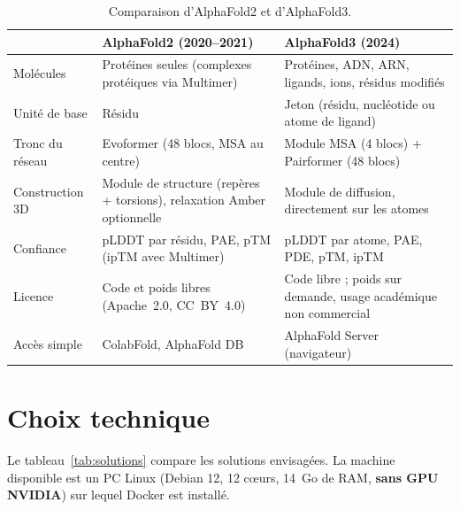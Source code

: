 \begin{table}[H]
\centering
\footnotesize
\begin{tabularx}{\textwidth}{>{\raggedright\arraybackslash}p{3cm}>{\raggedright\arraybackslash}X>{\raggedright\arraybackslash}X}
\toprule
 & \textbf{AlphaFold2 (2020--2021)} & \textbf{AlphaFold3 (2024)} \\
\midrule
Molécules & Protéines seules (complexes protéiques via Multimer) & Protéines, ADN, ARN, ligands, ions, résidus modifiés \\
Unité de base & Résidu & Jeton (résidu, nucléotide ou atome de ligand) \\
Tronc du réseau & Evoformer (48 blocs, MSA au centre) & Module MSA (4 blocs) + Pairformer (48 blocs) \\
Construction 3D & Module de structure (repères + torsions), relaxation Amber optionnelle & Module de diffusion, directement sur les atomes \\
Confiance & pLDDT par résidu, PAE, pTM (ipTM avec Multimer) & pLDDT par atome, PAE, PDE, pTM, ipTM \\
Licence & Code et poids libres (Apache~2.0, CC~BY~4.0) & Code libre ; poids sur demande, usage académique non commercial \\
Accès simple & ColabFold, AlphaFold DB & AlphaFold Server (navigateur) \\
\bottomrule
\end{tabularx}
\caption{Comparaison d'AlphaFold2 et d'AlphaFold3.}
\label{tab:af2_af3}
\end{table}

\section{Choix technique}

Le tableau~\ref{tab:solutions} compare les solutions envisagées. La machine disponible est un PC Linux (Debian 12, 12 cœurs, 14~Go de RAM, \textbf{sans GPU NVIDIA}) sur lequel Docker est installé.

